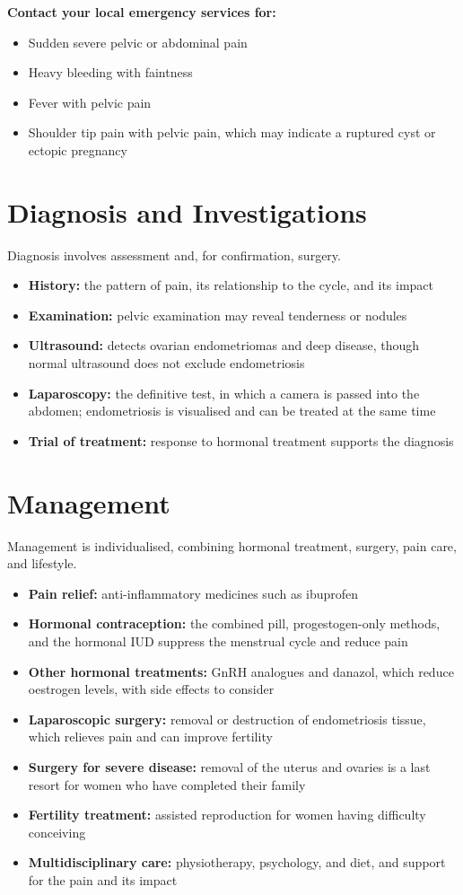 \textbf{Contact your local emergency services for:}
\begin{itemize}
    \item Sudden severe pelvic or abdominal pain
    \item Heavy bleeding with faintness
    \item Fever with pelvic pain
    \item Shoulder tip pain with pelvic pain, which may indicate a ruptured cyst or ectopic pregnancy
\end{itemize}

\section*{Diagnosis and Investigations}
Diagnosis involves assessment and, for confirmation, surgery.
\begin{itemize}
    \item \textbf{History:} the pattern of pain, its relationship to the cycle, and its impact
    \item \textbf{Examination:} pelvic examination may reveal tenderness or nodules
    \item \textbf{Ultrasound:} detects ovarian endometriomas and deep disease, though normal ultrasound does not exclude endometriosis
    \item \textbf{Laparoscopy:} the definitive test, in which a camera is passed into the abdomen; endometriosis is visualised and can be treated at the same time
    \item \textbf{Trial of treatment:} response to hormonal treatment supports the diagnosis
\end{itemize}

\section*{Management}
Management is individualised, combining hormonal treatment, surgery, pain care, and lifestyle.
\begin{itemize}
    \item \textbf{Pain relief:} anti-inflammatory medicines such as ibuprofen
    \item \textbf{Hormonal contraception:} the combined pill, progestogen-only methods, and the hormonal IUD suppress the menstrual cycle and reduce pain
    \item \textbf{Other hormonal treatments:} GnRH analogues and danazol, which reduce oestrogen levels, with side effects to consider
    \item \textbf{Laparoscopic surgery:} removal or destruction of endometriosis tissue, which relieves pain and can improve fertility
    \item \textbf{Surgery for severe disease:} removal of the uterus and ovaries is a last resort for women who have completed their family
    \item \textbf{Fertility treatment:} assisted reproduction for women having difficulty conceiving
    \item \textbf{Multidisciplinary care:} physiotherapy, psychology, and diet, and support for the pain and its impact
\end{itemize}

